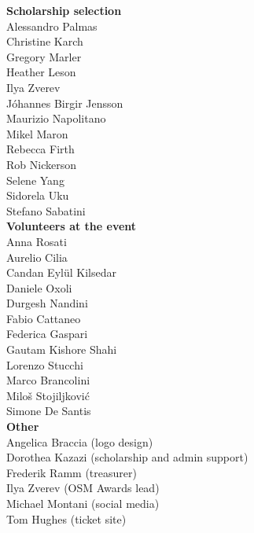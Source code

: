 \begin{multicols}{2}
\begin{small}
    \vspace{\volunteerSpace}
    \textbf{Scholarship selection}\\
    Alessandro Palmas\\
    Christine Karch\\
    Gregory Marler\\
    Heather Leson\\
    Ilya Zverev\\
    Jóhannes Birgir Jensson\\
    Maurizio Napolitano\\
    Mikel Maron\\
    Rebecca Firth\\
    Rob Nickerson\\
    Selene Yang\\
    Sidorela Uku\\
    Stefano Sabatini\\

    \vspace{\volunteerSpace}
    \textbf{Volunteers at the event}\\
    Anna Rosati\\
    Aurelio Cilia\\
    Candan Eylül Kilsedar\\
    Daniele Oxoli\\
    Durgesh Nandini\\
    Fabio Cattaneo\\
    Federica Gaspari\\
    Gautam Kishore Shahi\\
    Lorenzo Stucchi\\
    Marco Brancolini\\
    Miloš Stojiljković\\
    Simone De Santis\\

    \vspace{\volunteerSpace}
    \textbf{Other}\\
    Angelica Braccia (logo design)\\
    Dorothea Kazazi (scholarship and admin support)\\
    Frederik Ramm (treasurer)\\
    Ilya Zverev (OSM Awards lead)\\
    Michael Montani (social media)\\
    Tom Hughes (ticket site)\\
  \end{small}
\end{multicols}
\justifying

\newpage
\pagestyle{sponsor-microsoft}
\null
\newpage
\pagestyle{sponsor-facebook}
\null
\newpage
\pagestyle{sponsor-mapbox}
\null
\newpage
\pagestyle{sponsor-immobiliare}
\null
\newpage
\pagestyle{sponsor-telenav}
\null
\newpage
\pagestyle{sponsor-kaartmapsme}
\null
